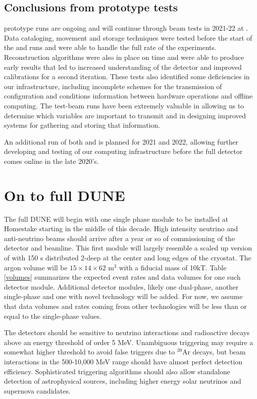 \subsection{Conclusions from prototype tests}
 prototype runs are ongoing and will continue through beam tests in 2021-22 at .  Data cataloging, movement and storage techniques were tested before the start of the  and   runs and were able to handle the full rate of the experiments.   Reconstruction algorithms were also in place on time and were able to produce early results that led to increased understanding of the detector and improved calibrations for a second iteration.  These tests also identified some deficiencies in our infrastructure, including incomplete schemes for the transmission of configuration and conditions information between hardware operations and  offline computing.  The test-beam runs have been extremely valuable in allowing us to determine which variables are important to transmit and in designing improved systems for gathering and storing that information. 

An additional run of both  and  is planned for 2021 and 2022, allowing further developing and testing of our computing infrastructure before the full detector comes online in the late 2020's. 


\section{On to full DUNE}

The full DUNE  will begin with one single phase module to be installed at Homestake starting in the middle of  this decade.  High intensity neutrino and anti-neutrino beams should arrive after a year or so of commissioning of the detector and  beamline.  This first module will largely resemble a scaled up version of  with 150 s distributed 2-deep at the center and long edges of the cryostat.   The argon volume will be $15\times14\times62$ m$^3$ with a fiducial mass of 10kT.  Table \ref{volumes} summarizes the expected event rates and data volumes for one such detector module.  Additional detector modules, likely one dual-phase, another single-phase and  one with novel technology will be added.  For now, we assume that data volumes and rates coming from other technologies will be less than or equal to the single-phase values. 



The detectors should be sensitive to neutrino interactions and radioactive decays above an energy threshold of order 5 MeV.  Unambiguous triggering may require a somewhat higher threshold  to avoid false triggers due to $^{39}$Ar decays,  but beam interactions in the 500-10,000 MeV range should have almost perfect detection efficiency. Sophisticated triggering algorithms should also allow standalone detection of astrophysical sources, including higher energy solar neutrinos and supernova candidates. 

